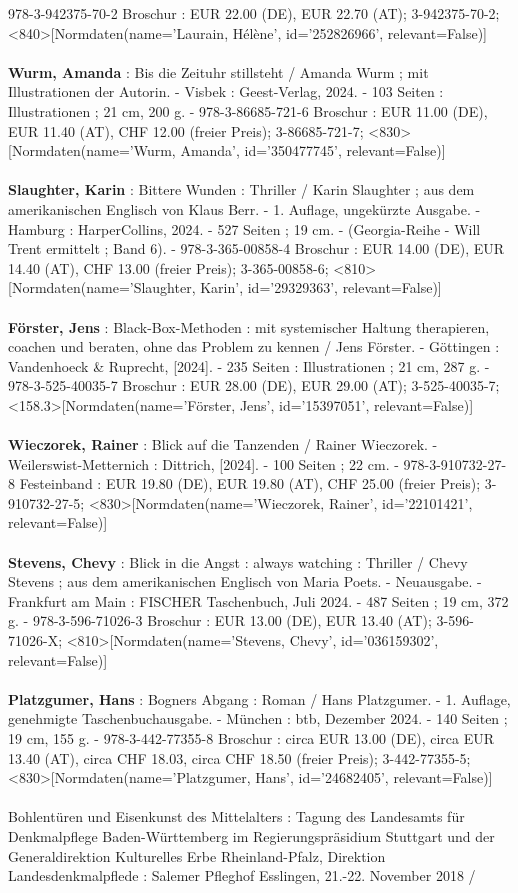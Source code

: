 \documentclass{article}
\begin{document}
\begin{multicols}{3}
978-3-942375-70-2 Broschur : EUR 22.00 (DE), EUR 22.70 (AT); 3-942375-70-2; <840>[Normdaten(name='Laurain, Hélène', id='252826966', relevant=False)]\\\\\textbf{Wurm, Amanda} : Bis die Zeituhr stillsteht / Amanda Wurm ; mit Illustrationen der Autorin. - Visbek : Geest-Verlag, 2024. - 103 Seiten : Illustrationen ; 21 cm, 200 g. - 978-3-86685-721-6 Broschur : EUR 11.00 (DE), EUR 11.40 (AT), CHF 12.00 (freier Preis); 3-86685-721-7; <830>[Normdaten(name='Wurm, Amanda', id='350477745', relevant=False)]\\\\\textbf{Slaughter, Karin} : Bittere Wunden : Thriller / Karin Slaughter ; aus dem amerikanischen Englisch von Klaus Berr. - 1. Auflage, ungekürzte Ausgabe. - Hamburg : HarperCollins, 2024. - 527 Seiten ; 19 cm. - (Georgia-Reihe - Will Trent ermittelt ; Band 6). - 978-3-365-00858-4 Broschur : EUR 14.00 (DE), EUR 14.40 (AT), CHF 13.00 (freier Preis); 3-365-00858-6; <810>[Normdaten(name='Slaughter, Karin', id='29329363', relevant=False)]\\\\\textbf{Förster, Jens} : Black-Box-Methoden : mit systemischer Haltung therapieren, coachen und beraten, ohne das Problem zu kennen / Jens Förster. - Göttingen : Vandenhoeck \& Ruprecht, [2024]. - 235 Seiten : Illustrationen ; 21 cm, 287 g. - 978-3-525-40035-7 Broschur : EUR 28.00 (DE), EUR 29.00 (AT); 3-525-40035-7; <158.3>[Normdaten(name='Förster, Jens', id='15397051', relevant=False)]\\\\\textbf{Wieczorek, Rainer} : Blick auf die Tanzenden / Rainer Wieczorek. - Weilerswist-Metternich : Dittrich, [2024]. - 100 Seiten ; 22 cm. - 978-3-910732-27-8 Festeinband : EUR 19.80 (DE), EUR 19.80 (AT), CHF 25.00 (freier Preis); 3-910732-27-5; <830>[Normdaten(name='Wieczorek, Rainer', id='22101421', relevant=False)]\\\\\textbf{Stevens, Chevy} : Blick in die Angst : always watching : Thriller / Chevy Stevens ; aus dem amerikanischen Englisch von Maria Poets. - Neuausgabe. - Frankfurt am Main : FISCHER Taschenbuch, Juli 2024. - 487 Seiten ; 19 cm, 372 g. - 978-3-596-71026-3 Broschur : EUR 13.00 (DE), EUR 13.40 (AT); 3-596-71026-X; <810>[Normdaten(name='Stevens, Chevy', id='036159302', relevant=False)]\\\\\textbf{Platzgumer, Hans} : Bogners Abgang : Roman / Hans Platzgumer. - 1. Auflage, genehmigte Taschenbuchausgabe. - München : btb, Dezember 2024. - 140 Seiten ; 19 cm, 155 g. - 978-3-442-77355-8 Broschur : circa EUR 13.00 (DE), circa EUR 13.40 (AT), circa CHF 18.03, circa CHF 18.50 (freier Preis); 3-442-77355-5; <830>[Normdaten(name='Platzgumer, Hans', id='24682405', relevant=False)]\\\\Bohlentüren und Eisenkunst des Mittelalters : Tagung des Landesamts für Denkmalpflege Baden-Württemberg im Regierungspräsidium Stuttgart und der Generaldirektion Kulturelles Erbe Rheinland-Pfalz, Direktion Landesdenkmalpflede : Salemer Pfleghof Esslingen, 21.-22. November 2018 / 
\end{multicols}
\end{document}
